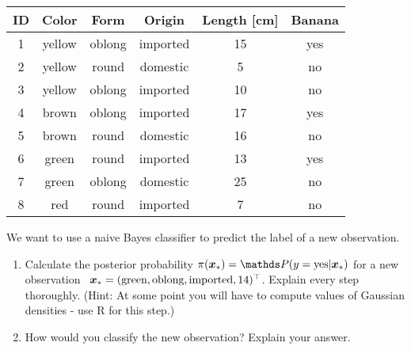\documentclass[a4paper]{article}
\newcounter{loes}
\begin{document}
{{\begin{tabular}{ | c | c | c | c | c | c |}
\hline
ID  &  Color   &  Form    &  Origin    & Length [cm]  &  Banana  \\  \hline
1   &  yellow  &  oblong  &  imported  & 15           &  yes      \\
2   &  yellow  &  round   &  domestic  & 5            &  no       \\
3   &  yellow  &  oblong  &  imported  & 10           &  no       \\
4   &  brown   &  oblong  &  imported  & 17           &  yes      \\
5   &  brown   &  round   &  domestic  & 16           &  no        \\
6   &  green   &  round   &  imported  & 13           &  yes       \\
7   &  green   &  oblong  &  domestic  & 25           &  no       \\
8   &  red     &  round   &  imported  & 7            &  no        \\
\hline
\end{tabular}

We want to use a naive Bayes classifier to predict the label of a new 
observation. 

\begin{enumerate}
  \item Calculate the posterior probability $\pi(\xv_*) = \P(y = \text{yes} | 
  \xv_*)$ for a new observation \ $\bm{x}_* = (\text{green}, \text{oblong}, 
  \text{imported}, 14)^\top$. Explain every step thoroughly. (Hint: At some 
  point you will have to compute values of Gaussian densities - use R for this
  step.)
  \item How would you classify the new observation? Explain your answer.
\end{enumerate}

}

\dlz
{}}
\end{document}
